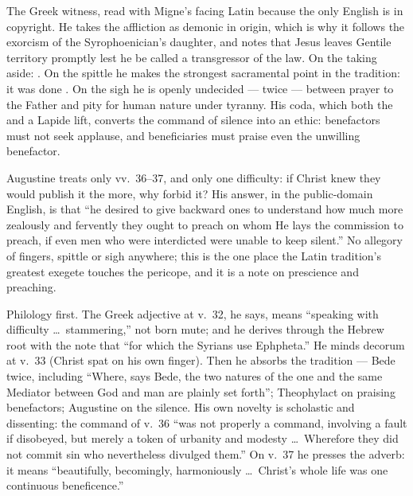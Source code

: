 \begin{witnessnote}
The Greek witness, read with Migne's facing Latin because the only English is
in copyright. He takes the affliction as demonic in origin, which is why it
follows the exorcism of the Syrophoenician's daughter, and notes that Jesus
leaves Gentile territory promptly lest he be called a transgressor of the law.
On the taking aside: . On the spittle he makes the strongest sacramental
point in the tradition: it was done . On the sigh he is
openly undecided --- twice  --- between prayer to the Father
and pity for human nature under tyranny. His coda, which both the 
and a Lapide lift, converts the command of silence into an ethic: benefactors
must not seek applause, and beneficiaries must praise even the unwilling
benefactor.
\end{witnessnote}

\begin{witnessnote}
Augustine treats only vv.~36--37, and only one difficulty: if Christ knew they
would publish it the more, why forbid it? His answer, in the public-domain
English, is that ``he desired to give backward ones to understand how much more
zealously and fervently they ought to preach on whom He lays the commission to
preach, if even men who were interdicted were unable to keep silent.'' No
allegory of fingers, spittle or sigh anywhere; this is the one place the
Latin tradition's greatest exegete touches the pericope, and it is a note on
prescience and preaching.
\end{witnessnote}

\begin{witnessnote}
Philology first. The Greek adjective at v.~32, he says, means ``speaking with
difficulty \dots\ stammering,'' not born mute; and  he derives
through the Hebrew root with the note that ``for which the Syrians use
Ephpheta.'' He minds decorum at v.~33 (Christ spat on his own finger). Then he
absorbs the tradition --- Bede twice, including ``Where, says Bede, the two
natures of the one and the same Mediator between God and man are plainly set
forth''; Theophylact on praising benefactors; Augustine on the silence. His own
novelty is scholastic and dissenting: the command of v.~36 ``was not properly a
command, involving a fault if disobeyed, but merely a token of urbanity and
modesty \dots\ Wherefore they did not commit sin who nevertheless divulged
them.'' On v.~37 he presses the adverb: it means ``beautifully, becomingly,
harmoniously \dots\ Christ's whole life was one continuous beneficence.''
\end{witnessnote}

